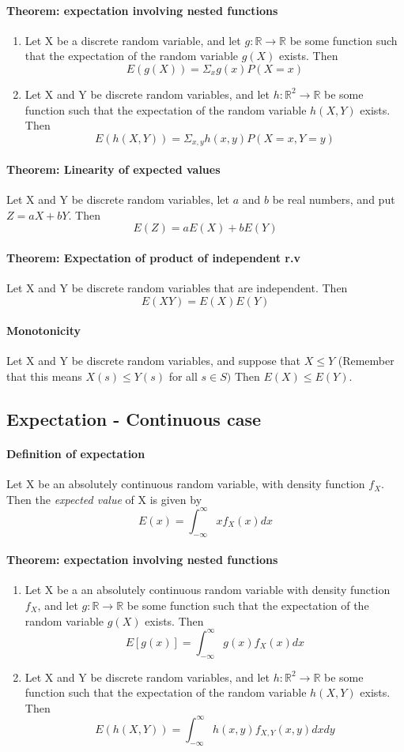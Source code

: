 \documentclass[11pt]{article}
\newcommand{\ti}[1]{\textit{#1}}
\newcommand{\mb}[1]{\mathbb{#1}}
\begin{document}
\paragraph{Theorem: expectation involving nested functions} 
\begin{enumerate}
\item Let X be a discrete random variable, and let $g: \mb{R} \rightarrow \mb{R}$ be some function such that the expectation of the random variable $g(X)$ exists. Then $$E(g(X)) = \Sigma_x g(x)P(X=x)$$
\item Let X and Y be discrete random variables, and let $h: \mb{R}^2 \rightarrow \mb{R}$ be some function such that the expectation of the random variable $h(X,Y)$ exists. Then
$$E(h(X,Y)) = \Sigma_{x,y}h(x,y)P(X=x,Y=y)$$
\end{enumerate}
\paragraph{Theorem: Linearity of expected values} Let X and Y be discrete random variables, let $a$ and $b$ be real numbers, and put $Z = aX + bY$. Then $$E(Z) = aE(X) + bE(Y)$$
\paragraph{Theorem: Expectation of product of independent r.v}Let X and Y be discrete random variables that are independent. Then $$E(XY) = E(X)E(Y)$$
\paragraph{Monotonicity} Let X and Y be discrete random variables, and suppose that $X \leq Y$ (Remember that this means $X(s) \leq Y(s)$ for all $s\in S)$ Then $E(X) \leq E(Y)$.
\subsection{Expectation - Continuous case}
\paragraph{Definition of expectation} Let X be an absolutely continuous random variable, with density function $f_X$. Then the \ti{expected value} of X is given by
$$ E(x) = \int_{-\infty}^{\infty}xf_X(x)dx$$
\paragraph{Theorem: expectation involving nested functions} 
\begin{enumerate}
\item Let X be a an absolutely continuous random variable with density function $f_X$, and let $g: \mb{R} \rightarrow \mb{R}$ be some function such that the expectation of the random variable $g(X)$ exists. Then $$E[g(x)]=\int_{-\infty}^{\infty} g(x)f_X(x)dx$$
\item Let X and Y be discrete random variables, and let $h: \mb{R}^2 \rightarrow \mb{R}$ be some function such that the expectation of the random variable $h(X,Y)$ exists. Then
 $$E(h(X,Y)) = \int_{-\infty}^{\infty}h(x,y)f_{X,Y}(x,y)dxdy$$
 \end{enumerate}
\end{document}
